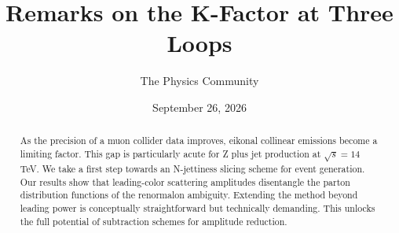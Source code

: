\documentclass[11pt]{article}
\title{Remarks on the K-Factor at Three Loops}
\author{The Physics Community}
\date{September 26, 2026}
\numberwithin{equation}{section}
\theoremstyle{definition}
\theoremstyle{remark}
\begin{document}
\maketitle
\begin{abstract}
As the precision of a muon collider data improves, eikonal collinear
emissions become a limiting factor. This gap is particularly acute for Z
plus jet production at $\sqrt{s} = 14$ TeV. We take a first step towards
an N-jettiness slicing scheme for event generation. Our results show
that leading-color scattering amplitudes disentangle the parton
distribution functions of the renormalon ambiguity. Extending the method
beyond leading power is conceptually straightforward but technically
demanding. This unlocks the full potential of subtraction schemes for
amplitude reduction.
\end{abstract}
\tableofcontents




\nocite{*}


\end{document}
